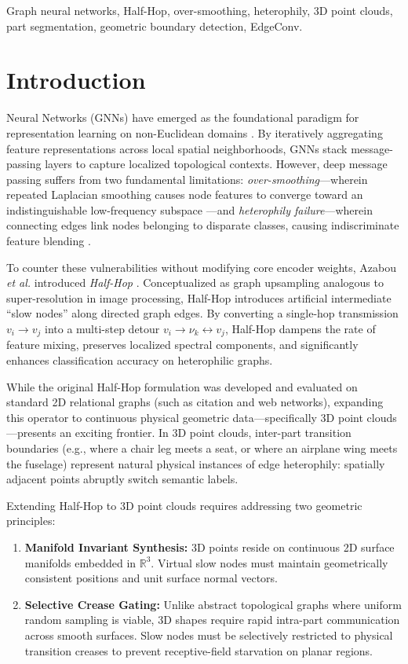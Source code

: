 \documentclass[journal]{IEEEtran}
\begin{document}
\begin{IEEEkeywords}
Graph neural networks, Half-Hop, over-smoothing, heterophily, 3D point clouds, part segmentation, geometric boundary detection, EdgeConv.
\end{IEEEkeywords}

\IEEEpeerreviewmaketitle

\section{Introduction}
 Neural Networks (GNNs) have emerged as the foundational paradigm for representation learning on non-Euclidean domains \cite{kipf, hamilton, gat}. By iteratively aggregating feature representations across local spatial neighborhoods, GNNs stack message-passing layers to capture localized topological contexts. However, deep message passing suffers from two fundamental limitations: \textit{over-smoothing}---wherein repeated Laplacian smoothing causes node features to converge toward an indistinguishable low-frequency subspace \cite{li2018deeper}---and \textit{heterophily failure}---wherein connecting edges link nodes belonging to disparate classes, causing indiscriminate feature blending \cite{pei}.

To counter these vulnerabilities without modifying core encoder weights, Azabou \textit{et al.} introduced \textit{Half-Hop} \cite{azabou}. Conceptualized as graph upsampling analogous to super-resolution in image processing, Half-Hop introduces artificial intermediate ``slow nodes'' along directed graph edges. By converting a single-hop transmission $v_i \to v_j$ into a multi-step detour $v_i \to \nu_k \leftrightarrow v_j$, Half-Hop dampens the rate of feature mixing, preserves localized spectral components, and significantly enhances classification accuracy on heterophilic graphs.

While the original Half-Hop formulation was developed and evaluated on standard 2D relational graphs (such as citation and web networks), expanding this operator to continuous physical geometric data---specifically 3D point clouds---presents an exciting frontier. In 3D point clouds, inter-part transition boundaries (e.g., where a chair leg meets a seat, or where an airplane wing meets the fuselage) represent natural physical instances of edge heterophily: spatially adjacent points abruptly switch semantic labels. 

Extending Half-Hop to 3D point clouds requires addressing two geometric principles:
\begin{enumerate}
    \item \textbf{Manifold Invariant Synthesis:} 3D points reside on continuous 2D surface manifolds embedded in $\mathbb{R}^3$. Virtual slow nodes must maintain geometrically consistent positions and unit surface normal vectors.
    \item \textbf{Selective Crease Gating:} Unlike abstract topological graphs where uniform random sampling is viable, 3D shapes require rapid intra-part communication across smooth surfaces. Slow nodes must be selectively restricted to physical transition creases to prevent receptive-field starvation on planar regions.
\end{enumerate}
\end{document}
